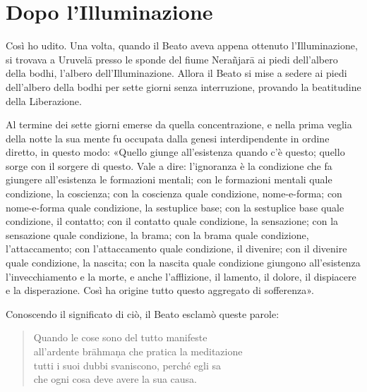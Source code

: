 \chapter{Dopo l’Illuminazione}

 Così ho udito. Una volta, quando il Beato aveva appena
ottenuto l’Illuminazione, si trovava a Uruvelā presso le sponde del fiume
Nerañjarā ai piedi dell’albero della bodhi, l’albero dell’Illuminazione. Allora
il Beato si mise a sedere ai piedi dell’albero della bodhi per sette giorni
senza interruzione, provando la beatitudine della Liberazione.

Al termine dei sette giorni emerse da quella concentrazione, e nella prima
veglia della notte la sua mente fu occupata dalla genesi interdipendente in
ordine diretto, in questo modo: «Quello giunge all’esistenza quando c’è questo;
quello sorge con il sorgere di questo. Vale a dire: l’ignoranza è la condizione
che fa giungere all’esistenza le formazioni mentali; con le formazioni mentali
quale condizione, la coscienza; con la coscienza quale condizione, nome-e-forma;
con nome-e-forma quale condizione, la sestuplice base; con la sestuplice base
quale condizione, il contatto; con il contatto quale condizione, la sensazione;
con la sensazione quale condizione, la brama; con la brama quale condizione,
l’attaccamento;
con l’attaccamento quale condizione, il divenire; con il
divenire quale condizione, la nascita; con la nascita quale condizione giungono
all’esistenza l’invecchiamento e la morte, e anche l’afflizione, il lamento, il
dolore, il dispiacere e la disperazione. Così ha origine tutto questo aggregato
di sofferenza».

Conoscendo il significato di ciò, il Beato esclamò queste parole:

\begin{quote}
  Quando le cose sono del tutto manifeste \\
  all’ardente brāhmaṇa
  che pratica la meditazione \\
  tutti i suoi dubbi svaniscono, perché egli sa \\
  che ogni cosa deve avere la sua causa.
\end{quote}

